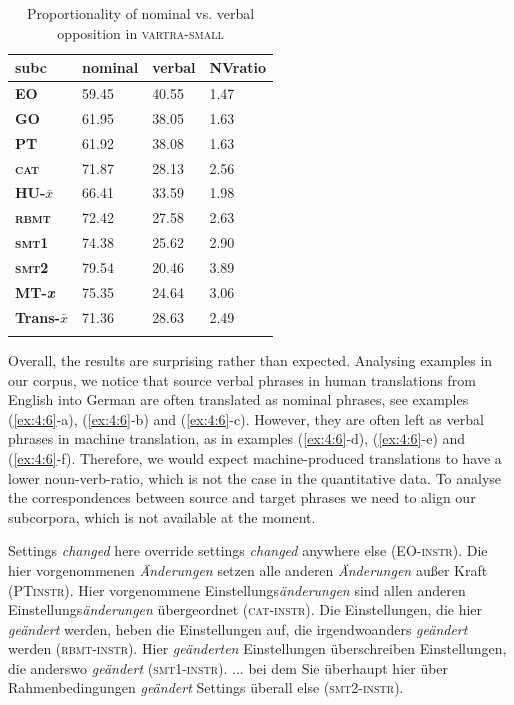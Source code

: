 \documentclass[output=paper]{LSP/langsci}
\begin{document}
\begin{table}
     \centering
     \begin{tabular}{llll}
\lsptoprule
\textbf{subc}    & \textbf{nominal}  & \textbf{verbal}  & \textbf{NVratio} \\ \midrule
\textbf{EO}    & 59.45   & 40.55  & 1.47 \\ \midrule
\textbf{GO}    & 61.95   & 38.05  & 1.63 \\ \midrule
\textbf{PT}    & 61.92	 & 38.08  & 1.63 \\
\textbf{\textsc{cat}}   & 71.87   & 28.13  & 2.56  \\ \midrule
\textbf{HU-$\bar{x}$}   & 66.41  & 33.59   & 1.98\\ \midrule
\textbf{\textsc{rbmt}}  & 72.42   & 27.58  & 2.63 \\
\textbf{\textsc{smt}1}  & 74.38	 & 25.62  & 2.90 \\
\textbf{\textsc{smt}2}  & 79.54   & 20.46  & 3.89 \\ \midrule
\textbf{MT-\textit{x}}   & 75.35  & 24.64  & 3.06 \\ \midrule
\textbf{Trans-$\bar{x}$} & 71.36 & 28.63  & 2.49 \\ 
\lspbottomrule
     \end{tabular}

 \caption{Proportionality of nominal vs. verbal opposition in \textsc{vartra}-\textsc{small}}
     \label{tab:4.4}
\end{table}


Overall, the results are surprising rather than expected. Analysing examples in our corpus, we notice that source verbal phrases in human translations from English into German are often translated as nominal phrases, see examples (\ref{ex:4:6}-a), (\ref{ex:4:6}-b) and (\ref{ex:4:6}-c). However, they are often left as verbal phrases in machine translation, as in examples (\ref{ex:4:6}-d), (\ref{ex:4:6}-e) and (\ref{ex:4:6}-f). Therefore, we would expect machine-produced translations to have a lower noun-verb-ratio, which is not the case in the quantitative data.  To analyse the correspondences between source and target phrases we need to align our subcorpora, which is not available at the moment.

\ea \label{ex:4:6}
\ea Settings \textit{changed} here override settings \textit{changed} anywhere else (EO-\textsc{instr}).
\ex Die hier vorgenommenen \textit{Änderungen} setzen alle anderen \textit{Änderungen} außer Kraft (PT\textsc{instr}).
\ex Hier vorgenommene Einstellungs\textit{änderungen} sind allen anderen Einstellungs\textit{änderungen} übergeordnet (\textsc{cat}-\textsc{instr}).
\ex Die Einstellungen, die hier \textit{geändert} werden, heben die Einstellungen auf, die irgendwoanders \textit{geändert} werden (\textsc{rbmt}-\textsc{instr}).
\ex Hier \textit{geänderten} Einstellungen überschreiben Einstellungen, die anderswo \textit{geändert} (\textsc{smt}1-\textsc{instr}).
\ex ... bei dem Sie überhaupt hier über Rahmenbedingungen \textit{geändert} Settings überall else (\textsc{smt}2-\textsc{instr}).
\z
\z
\end{document}
